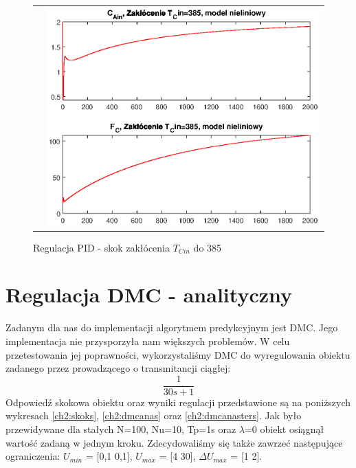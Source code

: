 \begin{figure}
\begin{tabular}{cc}
	&
	\includegraphics[width=.5\linewidth]{img/pidnlin/pidnlin15.eps}
\end{tabular}
\label{ch2:pid8}
\caption{Regulacja PID - skok zakłócenia $T_{Cin}$ do 385}
\end{figure}

\section{Regulacja DMC - analityczny}
Zadanym dla nas do implementacji algorytmem predykcyjnym jest DMC. Jego implementacja nie przysporzyła nam większych problemów. W celu przetestowania jej poprawności, wykorzystaliśmy DMC do wyregulowania obiektu zadanego przez prowadzącego o transmitancji ciągłej:
\begin{equation}
	\frac{1}{30s+1}
\end{equation}
Odpowiedź skokowa obiektu oraz wyniki regulacji przedstawione są na poniższych wykresach \ref{ch2:skoks}, \ref{ch2:dmcanas} oraz \ref{ch2:dmcanasters}. Jak było przewidywane dla stałych N=100, Nu=10, Tp=1s oraz $\lambda$=0 obiekt osiągnął wartość zadaną w jednym kroku. Zdecydowaliśmy się także zawrzeć następujące ograniczenia: $U_{min}$ = [0,1 0,1], $U_{max}$ = [4 30], $\Delta U_{max}$ = [1 2].

